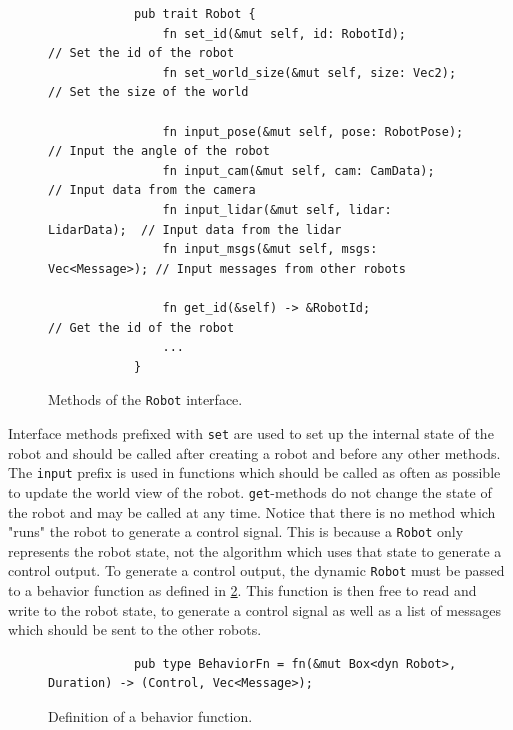 \begin{figure}[H]
    \begin{center}
        \begin{verbatim}
            pub trait Robot {
                fn set_id(&mut self, id: RobotId);            // Set the id of the robot
                fn set_world_size(&mut self, size: Vec2);     // Set the size of the world

                fn input_pose(&mut self, pose: RobotPose);    // Input the angle of the robot
                fn input_cam(&mut self, cam: CamData);        // Input data from the camera
                fn input_lidar(&mut self, lidar: LidarData);  // Input data from the lidar
                fn input_msgs(&mut self, msgs: Vec<Message>); // Input messages from other robots

                fn get_id(&self) -> &RobotId;                 // Get the id of the robot
                ...
            }
        \end{verbatim}
    \end{center}
    \caption{Methods of the \texttt{Robot} interface.}\label{fig:robot-interface}
\end{figure}

Interface methods prefixed with \texttt{set} are used to set up the internal state of the robot and should be called after creating a robot and before any other methods. The \texttt{input} prefix is used in functions which should be called as often as possible to update the world view of the robot. \texttt{get}-methods do not change the state of the robot and may be called at any time. Notice that there is no method which "runs" the robot to generate a control signal. This is because a \texttt{Robot} only represents the robot state, not the algorithm which uses that state to generate a control output. To generate a control output, the dynamic \texttt{Robot} must be passed to a behavior function as defined in \cref{fig:behavior-fn}. This function is then free to read and write to the robot state, to generate a control signal as well as a list of messages which should be sent to the other robots.

\begin{figure}[H]
    \begin{center}
        \begin{verbatim}
            pub type BehaviorFn = fn(&mut Box<dyn Robot>, Duration) -> (Control, Vec<Message>);
        \end{verbatim}
    \end{center}
    \caption{Definition of a behavior function.}\label{fig:behavior-fn}
\end{figure}


